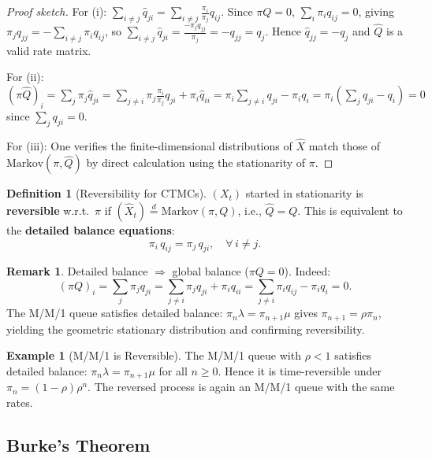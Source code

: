 \documentclass[12pt, a4paper]{article}
\theoremstyle{definition}
\newtheorem{definition}{Definition}[section]
\newtheorem{example}{Example}[section]
\newtheorem{remark}{Remark}[section]
\theoremstyle{plain}
\begin{document}
\begin{proof}[Proof sketch]
For (i): $\sum_{i \ne j} \hat{q}_{ji} = \sum_{i \ne j} \frac{\pi_i}{\pi_j} q_{ij}$. Since $\pi Q = 0$, $\sum_{i} \pi_i q_{ij} = 0$, giving $\pi_j q_{jj} = -\sum_{i \ne j} \pi_i q_{ij}$, so $\sum_{i \ne j} \hat{q}_{ji} = \frac{-\pi_j q_{jj}}{\pi_j} = -q_{jj} = q_j$. Hence $\hat{q}_{jj} = -q_j$ and $\hat{Q}$ is a valid rate matrix.

For (ii): $(\pi \hat{Q})_i = \sum_j \pi_j \hat{q}_{ji} = \sum_{j \ne i} \pi_j \frac{\pi_i}{\pi_j} q_{ji} + \pi_i \hat{q}_{ii} = \pi_i \sum_{j \ne i} q_{ji} - \pi_i q_i = \pi_i(\sum_j q_{ji} - q_i) = 0$ since $\sum_j q_{ji} = 0$.

For (iii): One verifies the finite-dimensional distributions of $\hat{X}$ match those of $\text{Markov}(\pi, \hat{Q})$ by direct calculation using the stationarity of $\pi$.
\end{proof}

\begin{definition}[Reversibility for CTMCs]
$(X_t)$ started in stationarity is \textbf{reversible} w.r.t.\ $\pi$ if $(\hat{X}_t) \stackrel{d}{=} \text{Markov}(\pi, Q)$, i.e., $\hat{Q} = Q$. This is equivalent to the \textbf{detailed balance equations}:
\[
  \pi_i\,q_{ij} = \pi_j\,q_{ji}, \quad \forall\, i \ne j.
\]
\end{definition}

\begin{remark}
Detailed balance $\Rightarrow$ global balance ($\pi Q = 0$). Indeed:
\[
  (\pi Q)_i = \sum_j \pi_j q_{ji} = \sum_{j \ne i} \pi_j q_{ji} + \pi_i q_{ii} = \sum_{j \ne i} \pi_i q_{ij} - \pi_i q_i = 0.
\]
The M/M/1 queue satisfies detailed balance: $\pi_n \lambda = \pi_{n+1} \mu$ gives $\pi_{n+1} = \rho\pi_n$, yielding the geometric stationary distribution and confirming reversibility.
\end{remark}

\begin{example}[M/M/1 is Reversible]
The M/M/1 queue with $\rho < 1$ satisfies detailed balance: $\pi_n \lambda = \pi_{n+1}\mu$ for all $n \ge 0$. Hence it is time-reversible under $\pi_n = (1-\rho)\rho^n$. The reversed process is again an M/M/1 queue with the same rates.
\end{example}

\subsection{Burke's Theorem}
\end{document}
